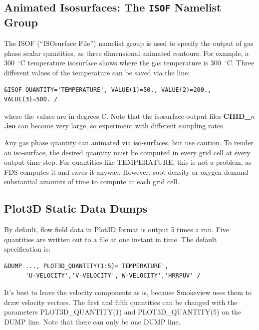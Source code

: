 \documentclass[11pt]{book}
\begin{document}
\subsection{Animated Isosurfaces: The \texorpdfstring{{\tt ISOF}}{ISOF} Namelist Group}%

\label{info:ISOF}

The {\ct ISOF} (``ISOsurface File'') namelist group is used to specify the output of
gas phase scalar quantities, as three dimensional animated contours.
For example, a 300~$^\circ$C temperature isosurface shows where the gas temperature is
300~$^\circ$C.
Three different values of the temperature can be saved via the line:

\footnotesize
\begin{verbatim}
&ISOF QUANTITY='TEMPERATURE', VALUE(1)=50., VALUE(2)=200., VALUE(3)=500. /
\end{verbatim}
\normalsize

\noindent
where the values are in degrees C. Note that the isosurface output
files {\bf CHID\_$n$.iso} can become very large, so experiment with different sampling rates.

Any gas phase quantity can animated via iso-surfaces, but use caution. To render an iso-surface, the desired quantity must be
computed in every grid cell at every output time step. For quantities like {\ct TEMPERATURE}, this is not a problem, as FDS computes it and saves it
anyway. However, {\ct soot density} or {\ct oxygen} demand substantial amounts of time to compute at each grid cell.




\subsection{Plot3D Static Data Dumps}%
\label{info:PL3D}

By default, flow field data in Plot3D format is output 5 times a run. Five quantities are written out to a file at one instant in
time. The default specification is:

\footnotesize
\begin{verbatim}
&DUMP ..., PLOT3D_QUANTITY(1:5)='TEMPERATURE',
      'U-VELOCITY','V-VELOCITY','W-VELOCITY','HRRPUV' /
\end{verbatim}
\normalsize

\noindent
It's best to leave the velocity components as is, because Smokeview
uses them to draw velocity vectors. The first and fifth quantities can
be changed with the parameters {\ct PLOT3D\_QUANTITY(1)} and {\ct PLOT3D\_QUANTITY(5)} on the {\ct DUMP} line.
Note that there can only be one {\ct DUMP} line.
\end{document}
